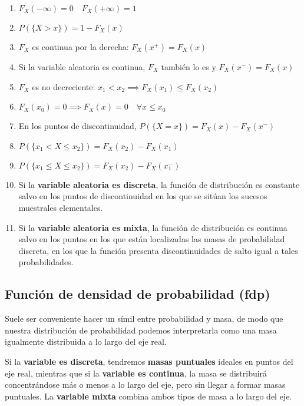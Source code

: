 \documentclass[11pt]{article}
\providecommand{\tightlist}{%
      \setlength{\itemsep}{0pt}\setlength{\parskip}{0pt}}
\begin{document}
\begin{enumerate}
\def\labelenumi{\arabic{enumi}.}
\tightlist
\item
  \(F_X(-\infty) = 0 \quad F_X(+\infty) = 1\)
\item
  \(P(\{X>x\})=1-F_X(x)\)
\item
  \(F_X\) es continua por la derecha: \(F_X(x^+)=F_X(x)\)
\item
  Si la variable aleatoria es continua, \(F_X\) también lo es y
  \(F_X(x^-)=F_X(x)\)
\item
  \(F_X\) es no decreciente:
  \(x_1 < x_2 \implies F_X(x_1)\leq F_X(x_2)\)
\item
  \(F_X(x_0)=0 \implies F_X(x) = 0 \quad\forall x \leq x_0\)
\item
  En los puntos de discontinuidad, \(P(\{X = x\})=F_X(x)-F_X(x^-)\)
\item
  \(P(\{x_1<X\leq x_2\})=F_X(x_2)-F_X(x_1)\)
\item
  \(P(\{x_1 \leq X\leq x_2\})=F_X(x_2)-F_X(x_1^-)\)
\item
  Si la \textbf{variable aleatoria es discreta}, la función de
  distribución es constante salvo en los puntos de discontinuidad en los
  que se sitúan los sucesos muestrales elementales.
\item
  Si la \textbf{variable aleatoria es mixta}, la función de distribución
  es continua salvo en los puntos en los que están localizadas las masas
  de probabilidad discreta, en los que la función presenta
  discontinuidades de salto igual a tales probabilidades.
\end{enumerate}

    \hypertarget{funciuxf3n-de-densidad-de-probabilidad-fdp}{%
\subsection*{Función de densidad de probabilidad
(fdp)}\label{funciuxf3n-de-densidad-de-probabilidad-fdp}}

Suele ser conveniente hacer un símil entre probabilidad y masa, de modo
que nuestra distribución de probabilidad podemos interpretarla como una
masa igualmente distribuida a lo largo del eje real.

Si la \textbf{variable es discreta}, tendremos \textbf{masas puntuales}
ideales en puntos del eje real, mientras que si la \textbf{variable es
continua}, la masa se distribuirá concentrándose más o menos a lo largo
del eje, pero sin llegar a formar masas puntuales. La \textbf{variable
mixta} combina ambos tipos de masa a lo largo del eje.
\end{document}
